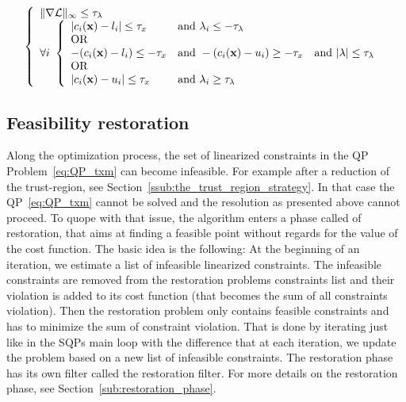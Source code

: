 \begin{equation}
\label{KKTfinal}
\left\{
\begin{array}{lr}
  \|\nabla \mathcal{L}\|_\infty \leq \tau_\lambda \\
  \forall i\
  \left\{
  \begin{array}{lll}
  |c_i({\bf x}) - l_i| \leq \tau_x & \text{and } \lambda_i \leq -\tau_\lambda\\
  \text{OR}\\
  -(c_i({\bf x}) - l_i) \leq -\tau_x &\text{and } -(c_i({\bf x}) - u_i) \geq -\tau_x & \text{and } |\lambda| \leq \tau_\lambda \\
  \text{OR}\\
  |c_i({\bf x}) - u_i| \leq \tau_x & \text{and } \lambda_i \geq \tau_\lambda\\
  \end{array}
  \right.
\end{array}
\right.
\end{equation}

\subsection{Feasibility restoration}
\label{sub:feasibility_restoration}

Along the optimization process, the set of linearized constraints in the QP Problem~\ref{eq:QP_txm} can become infeasible.
For example after a reduction of the trust-region, see Section~\ref{ssub:the_trust_region_strategy}.
In that case the QP~\ref{eq:QP_txm} cannot be solved and the resolution as presented above cannot proceed.
To quope with that issue, the algorithm enters a phase called of restoration, that aims at finding a feasible point without regards for the value of the cost function.
The basic idea is the following: At the beginning of an iteration, we estimate a list of infeasible linearized constraints.
The infeasible constraints are removed from the restoration problems constraints list and their violation is added to its cost function (that becomes the sum of all constraints violation).
Then the restoration problem only contains feasible constraints and has to minimize the sum of constraint violation.
That is done by iterating just like in the SQPs main loop with the difference that at each iteration, we update the problem based on a new list of infeasible constraints.
The restoration phase has its own filter called the restoration filter.
For more details on the restoration phase, see Section~\ref{sub:restoration_phase}.

